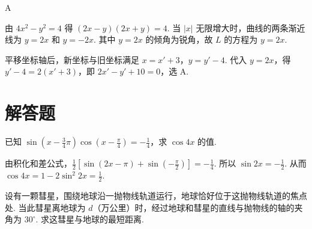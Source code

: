 \begin{answer}
A
\end{answer}

\begin{solution}
由 \(4x^2-y^2=4\) 得 \((2x-y)(2x+y)=4\). 当 \(\lvert x\rvert\) 无限增大时，曲线的两条渐近线为 \(y=2x\) 和 \(y=-2x\). 其中 \(y=2x\) 的倾角为锐角，故 \(L\) 的方程为 \(y=2x\).

平移坐标轴后，新坐标与旧坐标满足 \(x=x'+3\)，\(y=y'-4\). 代入 \(y=2x\)，得 \(y'-4=2(x'+3)\)，即 \(2x'-y'+10=0\)，选 A.
\end{solution}

\section{解答题}

\begin{problem}
已知 \(\sin\left(x - \frac{3}{4}\pi\right)\cos\left(x - \frac{\pi}{4}\right) = -\frac{1}{4}\)，求 \(\cos 4x\) 的值.
\end{problem}

\begin{solution}
由积化和差公式，\(\frac{1}{2}\left[\sin(2x - \pi) + \sin\left(-\frac{\pi}{2}\right)\right] = -\frac{1}{4}\). 所以 \(\sin 2x = -\frac{1}{2}\). 从而 \(\cos 4x = 1 - 2\sin^2 2x = \frac{1}{2}\).
\end{solution}

\begin{problem}
设有一颗彗星，围绕地球沿一抛物线轨道运行，地球恰好位于这抛物线轨道的焦点处. 当此彗星离地球为 \(d\)（万公里）时，经过地球和彗星的直线与抛物线的轴的夹角为 \(30^{\circ}\). 求这彗星与地球的最短距离.
\end{problem}

